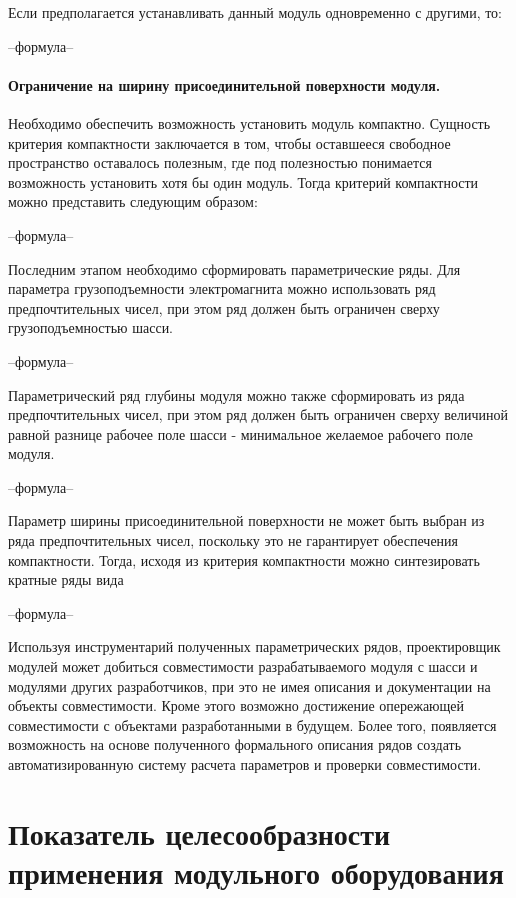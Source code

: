 Если предполагается устанавливать данный модуль одновременно с другими, то:

--формула--

\paragraph{Ограничение на ширину присоединительной поверхности модуля.} Необходимо обеспечить возможность установить модуль компактно. Сущность критерия компактности заключается в том, чтобы оставшееся свободное пространство оставалось полезным, где под полезностью понимается возможность установить хотя бы один модуль. Тогда критерий компактности можно представить следующим образом:

--формула--

Последним этапом необходимо сформировать параметрические ряды. Для параметра грузоподъемности электромагнита можно использовать ряд предпочтительных чисел, при этом ряд должен быть ограничен сверху грузоподъемностью шасси.

--формула--

Параметрический ряд глубины модуля можно также сформировать из ряда предпочтительных чисел, при этом ряд должен быть ограничен сверху величиной равной разнице  рабочее поле шасси - минимальное желаемое рабочего поле модуля.

--формула--

Параметр ширины присоединительной поверхности не может быть выбран из  ряда предпочтительных чисел, поскольку это не гарантирует обеспечения компактности. Тогда, исходя из критерия компактности можно синтезировать кратные ряды вида 

--формула--



Используя инструментарий полученных параметрических рядов, проектировщик модулей может добиться совместимости разрабатываемого модуля с шасси и модулями других разработчиков, при это не имея описания и документации на объекты совместимости. Кроме этого возможно достижение опережающей совместимости с объектами разработанными в будущем. Более того, появляется возможность на основе полученного формального описания рядов создать автоматизированную систему расчета параметров и проверки совместимости.

\section{Показатель целесообразности применения модульного оборудования}

